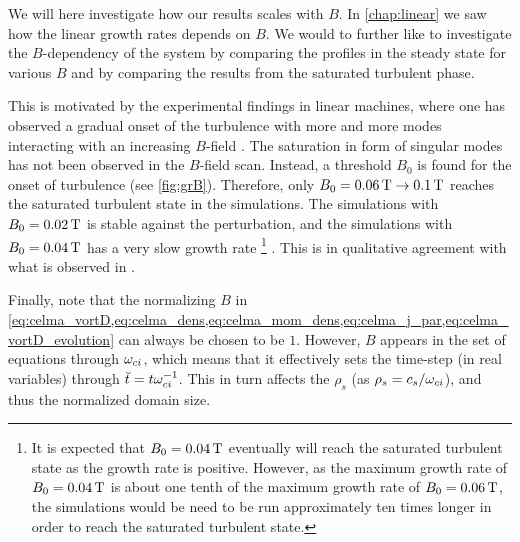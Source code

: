 %
We will here investigate how our results scales with $B$.
In \cref{chap:linear} we saw how the linear growth rates depends on $B$.
We would to further like to investigate the $B$-dependency of the system by comparing the profiles in the steady state for various $B$ and by comparing the results from the saturated turbulent phase.

This is motivated by the experimental findings in linear machines, where one has observed a gradual onset of the turbulence with more and more modes interacting with an increasing $B$-field \cite{Klinger1997,Klinger1997a,Burin2005}.
The saturation in form of singular modes has not been observed in the $B$-field scan.
Instead, a threshold $B_0$ is found for the onset of turbulence (see \cref{fig:grB}).
Therefore, only $B_0 = 0.06\, \text{T} \to 0.1\, \text{T}$ reaches the saturated turbulent state in the simulations.
The simulations with $B_0 = 0.02\, \text{T}$ is stable against the perturbation, and the simulations with $B_0 = 0.04\, \text{T}$ has a very slow growth rate%
\footnote{It is expected that $B_0=0.04\, \text{T}$ eventually will reach the saturated turbulent state as the growth rate is positive.
    However, as the maximum growth rate of $B_0=0.04\, \text{T}$ is about one tenth of the maximum growth rate of $B_0=0.06\, \text{T}$, the simulations would be need to be run approximately ten times longer in order to reach the saturated turbulent state.
}
%
.
This is in qualitative agreement with what is observed in \cite{Burin2005}.

Finally, note that the normalizing $B$ in \cref{eq:celma_vortD,eq:celma_dens,eq:celma_mom_dens,eq:celma_j_par,eq:celma_vortD_evolution} can always be chosen to be $1$.
However, $B$ appears in the set of equations through $\omega_{ci}$, which means that it effectively sets the time-step (in real variables) through $\breve{t}=t\omega_{ci}^{-1}$.
This in turn affects the $\rho_s$ (as $\rho_s=c_s/\omega_{ci}$), and thus the normalized domain size.

